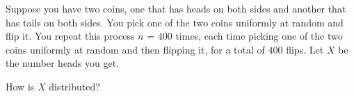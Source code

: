 Suppose you have two coins, one that has heads on both sides and another that has tails on both sides. You pick one of the two coins uniformly at random and flip it. You repeat this process $n$ = $400$ times, each time picking one of the two coins uniformly at random and then flipping it, for a total of $400$ flips. Let $X$ be the number heads you get.

\begin{question}
How is $X$ distributed?

\begin{solution}
\end{solution}
\end{question}
